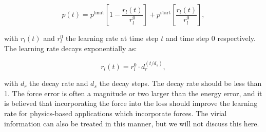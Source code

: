 \begin{equation}
    p(t) = p^{\text{limit}} \left[ 1 - \frac{r_l(t)}{r_l^0} \right]
    + p^{\text{start}} \left[ \frac{r_l(t)}{r_l^0} \right] ,
\end{equation}

with $r_l(t)$ and $r_l^0$ the learning rate at time step $t$ and time step
$0$ respectively. The learning rate decays exponentially as:

\begin{equation}
 r_l(t) = r_l^0 \cdot d_{r}^{\left(t / d_s\right)} , 
\end{equation}

with $d_r$ the decay rate and $d_s$ the decay steps. The decay
rate should be less than 1. The force error is often a magnitude or two
larger than the energy error, and it is believed that incorporating
the force into the loss should improve the learning rate for
physics-based applications which incorporate forces.
The virial information can also be treated in this manner,
but we will not discuss this here.
